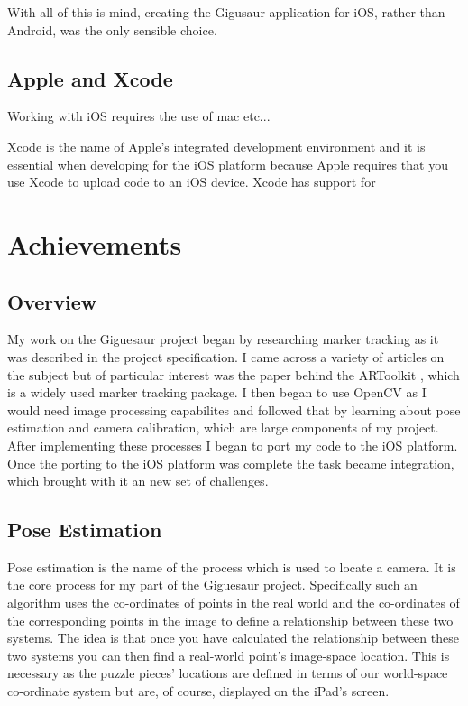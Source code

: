 \documentclass{article}
\begin{document}
With all of this is mind, creating the Gigusaur application for iOS, rather than Android, was the only sensible choice. 

\subsection{Apple and Xcode}

Working with iOS requires the use of mac etc...

Xcode is the name of Apple's integrated development environment and it is essential when developing for the iOS platform because Apple requires that you use Xcode to upload code to an iOS device. Xcode has support for 

\section{Achievements}

\subsection{Overview}

My work on the Giguesaur project began by researching marker tracking as it was described in the project specification. I came across a variety of articles on the subject but of particular interest was the paper behind the ARToolkit \cite{artoolkit}, which is a widely used marker tracking package. I then began to use OpenCV as I would need image processing capabilites and followed that by learning about pose estimation and camera calibration, which are large components of my project. After implementing these processes I began to port my code to the iOS platform. Once the porting to the iOS platform was complete the task became integration, which brought with it an new set of challenges. 

\subsection{Pose Estimation}

Pose estimation is the name of the process which is used to locate a camera. It is the core process for my part of the Giguesaur project. Specifically such an algorithm uses the co-ordinates of points in the real world and the co-ordinates of the corresponding points in the image to define a relationship between these two systems. The idea is that once you have calculated the relationship between these two systems you can then find a real-world point's image-space location. This is necessary as the puzzle pieces' locations are defined in terms of our world-space co-ordinate system but are, of course, displayed on the iPad's screen. 
\end{document}
